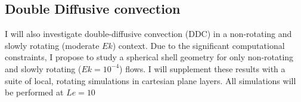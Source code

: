 \documentclass{article}
\begin{document}
\subsection{Double Diffusive convection}
I will also investigate double-diffusive convection (DDC) in a non-rotating and slowly rotating (moderate $Ek$) context. Due to the significant computational constraints, I propose to study a spherical shell geometry for only non-rotating and slowly rotating ($Ek = 10^{-4}$) flows. I will supplement these results with a suite of local, rotating simulations in cartesian plane layers. All simulations will be performed at $Le = 10$

\begin{multicols}{2}

\printbibliography

\end{multicols}
\end{document}
